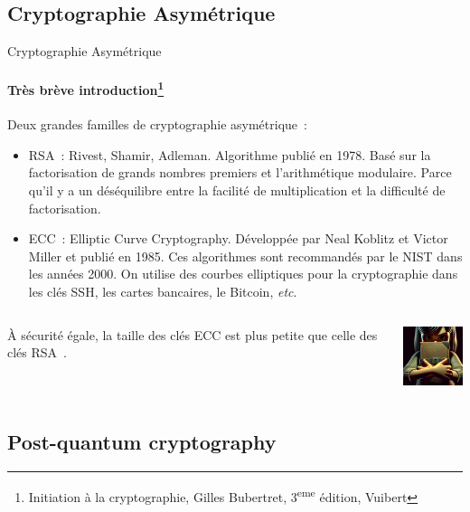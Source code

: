 \documentclass{beamer}
\begin{document}
    \subsection{Cryptographie Asymétrique}\label{subsec:cryptographie-asymetrique}
    \begin{frame}{Cryptographie Asymétrique}
        \framesubtitle{Très brève introduction\footnote{Initiation à la cryptographie, Gilles Bubertret, 3\textsuperscript{eme} édition, Vuibert}}
        \transdissolve
        Deux grandes familles de cryptographie asymétrique~:
        \begin{itemize}
            \item RSA~: Rivest, Shamir, Adleman.
            Algorithme publié en 1978.
            Basé sur la factorisation de grands nombres premiers et l'arithmétique modulaire.
            Parce qu'il y a un déséquilibre entre la facilité de multiplication et la difficulté de factorisation.
            \item ECC~: Elliptic Curve Cryptography.
            Développée par Neal Koblitz et Victor Miller et publié en 1985.
            Ces algorithmes sont recommandés par le NIST dans les années 2000.
            On utilise des courbes elliptiques pour la cryptographie dans les clés SSH, les cartes bancaires, le Bitcoin, \textit{etc}.
        \end{itemize}
        \begin{columns}
            \begin{column}{0.8\textwidth}
                À sécurité égale, la taille des clés ECC est plus petite que celle des clés RSA~.
            \end{column}
            \begin{column}{0.2\textwidth}
                \centering
                \includegraphics[width=2cm]{image/girl-hiding-a-secret}
            \end{column}
        \end{columns}
    \end{frame}

    \subsection{Post-quantum cryptography}\label{subsec:pqc}
\end{document}
